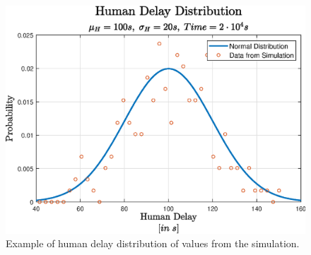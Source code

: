 \documentclass[10pt,a4paper]{article}
\begin{document}
			\begin{figure}[H]
				\centering
				\includegraphics[scale = 0.65]{Images/humanDelay}
				\caption{Example of human delay distribution of values from the simulation.}
			\end{figure}
\end{document}
